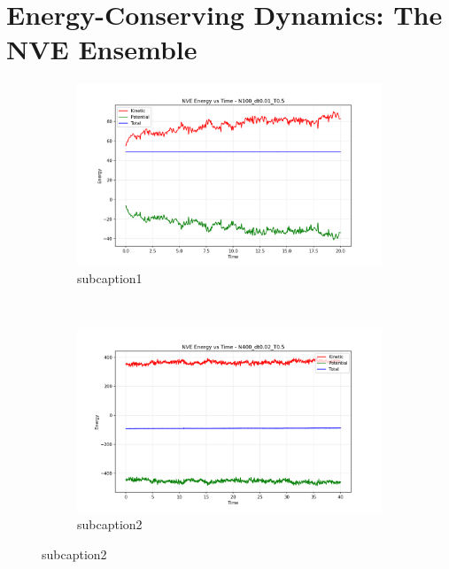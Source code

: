 \section{Energy-Conserving Dynamics: The NVE Ensemble}\label{sec:energy_conserving_dynamics_the_nve_ensemble} %
\begin{figure}[H]
	\centering
	\begin{subfigure}{0.5\textwidth}
		\includegraphics[width=\textwidth]{media/energy_N100_dt0.01_T0.5.png}
		\caption{subcaption1}
		\label{sfig:sublabel1}
	\end{subfigure}%
	~
	\begin{subfigure}{0.5\textwidth}
		\includegraphics[width=\textwidth]{media/energy_N400_dt0.02_T0.5.png}
		\caption{subcaption2}
		\label{sfig:sublabel2}

\end{subfigure}
\end{figure}
